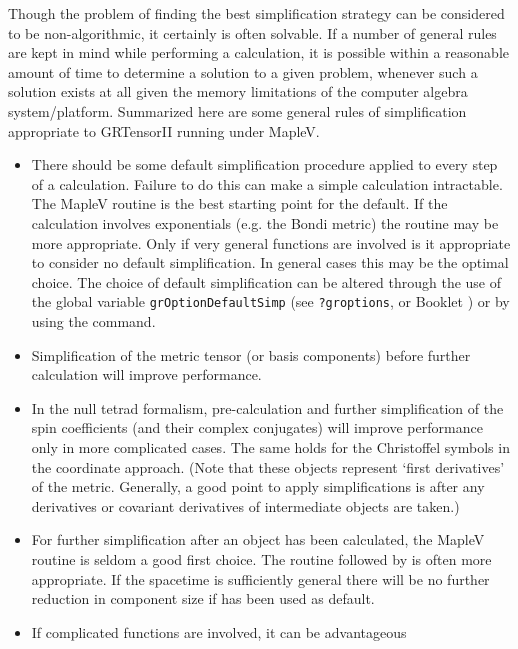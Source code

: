 \documentclass{article}
\begin{document}
{{{Though the problem of finding the best simplification strategy can be
considered to be non-algorithmic, it certainly is often solvable. If a
number of general rules are kept in mind while performing a
calculation, it is possible within a reasonable amount of time to
determine a solution to a given problem, whenever such a solution
exists at all given the memory limitations of the computer algebra
system/platform. Summarized here are some general rules of
simplification appropriate to GRTensorII running under MapleV.

\begin{itemize}
  \item There should be some default simplification procedure applied
    to every step of a calculation. Failure to do this can make a
    simple calculation intractable. The MapleV routine 
    is the best starting point for the default. If the calculation
    involves exponentials (e.g. the Bondi metric) the routine
     may be more appropriate. Only if very general
    functions are involved is it appropriate to consider no default
    simplification. In general cases this may be the optimal
    choice. The choice of default simplification can be altered
    through the use of the global variable
    \texttt{grOptionDefaultSimp} (see \texttt{?groptions}, or Booklet
    \grSetupRef) or by using the  command.
%
  \item Simplification of the metric tensor (or basis components)
    before further calculation will improve performance.
%
  \item In the null tetrad formalism, pre-calculation and further
    simplification of the spin coefficients (and their complex
    conjugates) will improve performance only in more complicated
    cases. The same holds for the Christoffel symbols in the
    coordinate approach. (Note that these objects represent `first
    derivatives' of the metric. Generally, a good point to apply
    simplifications is after any derivatives or covariant derivatives
    of intermediate objects are taken.)
%
  \item For further simplification after an object has been
    calculated, the MapleV routine  is seldom a good
    first choice. The routine  followed by
     is often more appropriate. If the spacetime is
    sufficiently general there will be no further reduction in
    component size if  has been used as default.
%
  \item If complicated functions are involved, it can be advantageous

\end{itemize}}}}
\end{document}

